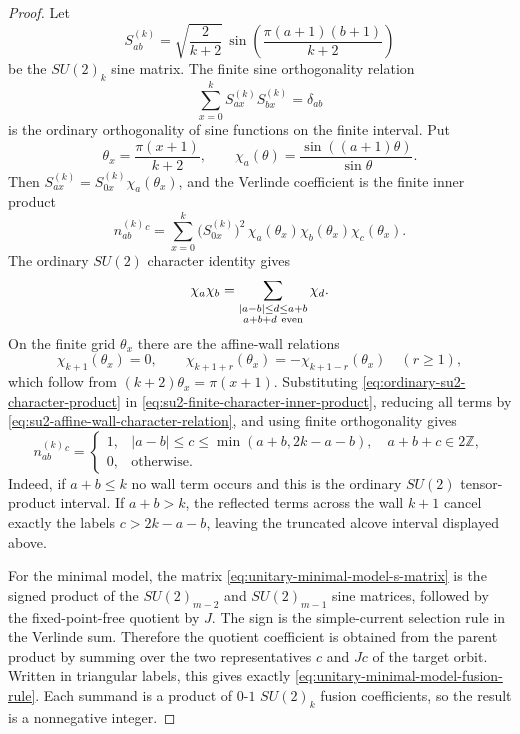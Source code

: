 \begin{proof}
Let
\[
  S^{(k)}_{ab}=\sqrt{\frac{2}{k+2}}\,
  \sin\!\left(\frac{\pi(a+1)(b+1)}{k+2}\right)
\]
be the \(SU(2)_k\) sine matrix.  The finite sine orthogonality relation
\[
  \sum_{x=0}^k
  S^{(k)}_{ax}S^{(k)}_{bx}=\delta_{ab}
\]
is the ordinary orthogonality of sine functions on the finite interval.
Put
\[
  \theta_x=\frac{\pi(x+1)}{k+2},
  \qquad
  \chi_a(\theta)=\frac{\sin((a+1)\theta)}{\sin\theta}.
\]
Then \(S^{(k)}_{ax}=S^{(k)}_{0x}\chi_a(\theta_x)\), and the Verlinde
coefficient is the finite inner product
\begin{equation}
  n^{(k)}_{ab}{}^c
  =
  \sum_{x=0}^k
  \bigl(S^{(k)}_{0x}\bigr)^2\,
  \chi_a(\theta_x)\chi_b(\theta_x)\chi_c(\theta_x).
  \label{eq:su2-finite-character-inner-product}
\end{equation}
The ordinary \(SU(2)\) character identity gives
\begin{equation}
  \chi_a\chi_b
  =
  \sum_{\substack{|a-b|\le d\le a+b\\ a+b+d\ {\rm even}}}\chi_d .
  \label{eq:ordinary-su2-character-product}
\end{equation}
On the finite grid \(\theta_x\) there are the affine-wall relations
\begin{equation}
  \chi_{k+1}(\theta_x)=0,\qquad
  \chi_{k+1+r}(\theta_x)=-\chi_{k+1-r}(\theta_x)
  \quad (r\ge1),
  \label{eq:su2-affine-wall-character-relation}
\end{equation}
which follow from \((k+2)\theta_x=\pi(x+1)\).  Substituting
\eqref{eq:ordinary-su2-character-product} in
\eqref{eq:su2-finite-character-inner-product}, reducing all terms by
\eqref{eq:su2-affine-wall-character-relation}, and using finite
orthogonality gives
\begin{equation}
  n^{(k)}_{ab}{}^c
  =
  \begin{cases}
  1,& |a-b|\le c\le \min(a+b,2k-a-b),\quad a+b+c\in2\mathbb Z,\\
  0,& \text{otherwise}.
  \end{cases}
  \label{eq:su2k-fusion-from-finite-grid}
\end{equation}
Indeed, if \(a+b\le k\) no wall term occurs and this is the ordinary
\(SU(2)\) tensor-product interval.  If \(a+b>k\), the reflected terms across
the wall \(k+1\) cancel exactly the labels \(c>2k-a-b\), leaving the truncated
alcove interval displayed above.

For the minimal model, the matrix
\eqref{eq:unitary-minimal-model-s-matrix} is the signed product of the
\(SU(2)_{m-2}\) and \(SU(2)_{m-1}\) sine matrices, followed by the
fixed-point-free quotient by \(J\).  The sign is the simple-current selection
rule in the Verlinde sum.  Therefore the quotient coefficient is obtained from
the parent product by summing over the two representatives \(c\) and \(Jc\) of
the target orbit.  Written in triangular labels, this gives exactly
\eqref{eq:unitary-minimal-model-fusion-rule}.  Each summand is a product of
\(0\)-\(1\) \(SU(2)_k\) fusion coefficients, so the result is a nonnegative
integer.
\end{proof}


